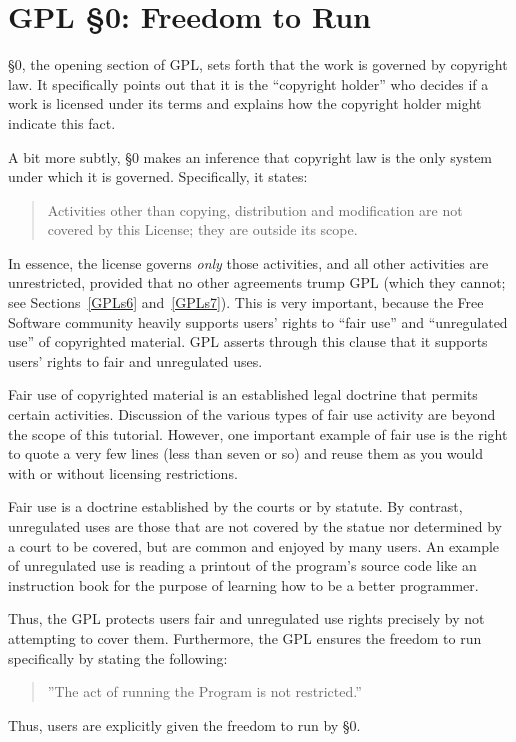 \documentclass[11pt, letterpaper]{book}
\begin{document}
\section{GPL \S 0: Freedom to Run}
\label{GPLs0}

\S 0, the opening section of GPL, sets forth that the work is governed by
copyright law. It specifically points out that it is the ``copyright
holder'' who decides if a work is licensed under its terms and explains
how the copyright holder might indicate this fact.

A bit more subtly, \S 0 makes an inference that copyright law is the only
system under which it is governed. Specifically, it states:
\begin{quote}
Activities other than copying, distribution and modification are not
covered by this License; they are outside its scope.
\end{quote}
In essence, the license governs \emph{only} those activities, and all other
activities are unrestricted, provided that no other agreements trump GPL
(which they cannot; see Sections~\ref{GPLs6} and~\ref{GPLs7}). This is
very important, because the Free Software community heavily supports
users' rights to ``fair use'' and ``unregulated use'' of copyrighted
material. GPL asserts through this clause that it supports users' rights
to fair and unregulated uses.

Fair use of copyrighted material is an established legal doctrine that
permits certain activities. Discussion of the various types of fair
use activity are beyond the scope of this tutorial. However, one
important example of fair use is the right to quote a very few lines
(less than seven or so) and reuse them as you would with or without
licensing restrictions.

Fair use is a doctrine established by the courts or by statute. By
contrast, unregulated uses are those that are not covered by the statue
nor determined by a court to be covered, but are common and enjoyed by
many users. An example of unregulated use is reading a printout of the
program's source code like an instruction book for the purpose of learning
how to be a better programmer.

\medskip

Thus, the GPL protects users fair and unregulated use rights precisely by
not attempting to cover them. Furthermore, the GPL ensures the freedom
to run specifically by stating the following:
\begin{quote}
''The act of running the Program is not restricted.''
\end{quote}
Thus, users are explicitly given the freedom to run by \S 0.
\end{document}
